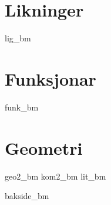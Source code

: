 \chapter{Likninger \label{Likningar}}
\newpage
{lig_bm}

\chapter{Funksjonar \label{Funksjoner}}
{funk_bm}

\chapter{Geometri}
\newpage
{geo2_bm}
\newpage
{kom2_bm}
{lit_bm}
{\printindex {}
	}
{bakside_bm}

















